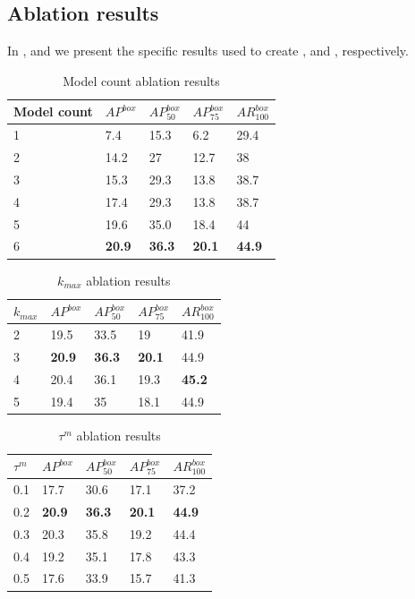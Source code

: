 \subsection{Ablation results}
In , 
 and
 we present the specific results used to create ,  and , respectively.
 \begin{table}[!ht]
    \centering
    \begin{tabular}{p{2cm}|p{0.8cm}p{0.8cm}p{0.8cm}p{0.8cm}}
    Model count & $AP^{box}$ & $AP_{50}^{box}$ & $AP_{75}^{box}$ & $AR_{100}^{box}$\tabularnewline
    \hline 
    \hfil 1 & 7.4 & 15.3 & 6.2 & 29.4\tabularnewline
    \hfil 2 & 14.2 & 27 & 12.7 & 38\tabularnewline
    \hfil 3 & 15.3 & 29.3 & 13.8 & 38.7\tabularnewline
    \hfil 4 & 17.4 & 29.3 & 13.8 & 38.7\tabularnewline
    \hfil 5 & 19.6 & 35.0 & 18.4 & 44\tabularnewline
    \hfil 6 & \textbf{20.9} & \textbf{36.3} & \textbf{20.1} & \textbf{44.9}\tabularnewline
    \hline 
    \end{tabular}
    \caption{Model count ablation results}
    \label{tab:model_count_ablation}
\end{table}

\begin{table}[!ht]
    \centering
    \begin{tabular}{p{0.6cm}|p{0.8cm}p{0.8cm}p{0.8cm}p{0.8cm}}
    $k_{max}$ & $AP^{box}$ & $AP_{50}^{box}$ & $AP_{75}^{box}$ & $AR_{100}^{box}$\tabularnewline
    \hline 
    2 & 19.5 & 33.5 & 19 & 41.9\tabularnewline
    3 & \textbf{20.9} & \textbf{36.3} & \textbf{20.1} & 44.9\tabularnewline
    4 & 20.4 & 36.1 & 19.3 & \textbf{45.2}\tabularnewline
    5 & 19.4 & 35 & 18.1 & 44.9\tabularnewline
    \hline 
    \end{tabular}
    \caption{$k_{max}$ ablation results}
    \label{tab:k_max-ablation-results}
\end{table}

\begin{table}[!ht]
    \centering
    \begin{tabular}{p{0.6cm}|p{0.8cm}p{0.8cm}p{0.8cm}p{0.8cm}}
    $\tau^{m}$ & $AP^{box}$ & $AP_{50}^{box}$ & $AP_{75}^{box}$ & $AR_{100}^{box}$\tabularnewline
    \hline 
    0.1 & 17.7 & 30.6 & 17.1 & 37.2\tabularnewline
    0.2 & \textbf{20.9} & \textbf{36.3} & \textbf{20.1} & \textbf{44.9}\tabularnewline
    0.3 & 20.3 & 35.8 & 19.2 & 44.4\tabularnewline
    0.4 & 19.2 & 35.1 & 17.8 & 43.3\tabularnewline
    0.5 & 17.6 & 33.9 & 15.7 & 41.3\tabularnewline
    \hline 
    \end{tabular}
    \caption{$\tau^m$ ablation results}
    \label{tab:tau_m_ablation-results}
\end{table}

